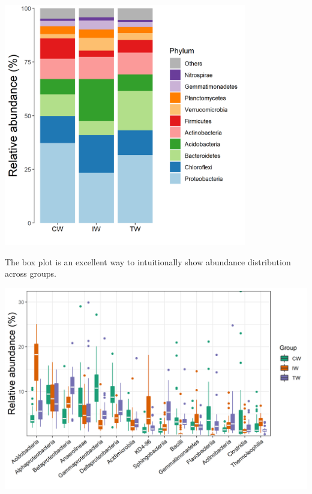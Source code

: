 \documentclass[
]{book}
\newenvironment{Shaded}{\begin{snugshade}}{\end{snugshade}}
\newcommand{\AttributeTok}[1]{\textcolor[rgb]{0.77,0.63,0.00}{#1}}
\newcommand{\CommentTok}[1]{\textcolor[rgb]{0.56,0.35,0.01}{\textit{#1}}}
\newcommand{\DecValTok}[1]{\textcolor[rgb]{0.00,0.00,0.81}{#1}}
\newcommand{\FunctionTok}[1]{\textcolor[rgb]{0.00,0.00,0.00}{#1}}
\newcommand{\NormalTok}[1]{#1}
\newcommand{\OtherTok}[1]{\textcolor[rgb]{0.56,0.35,0.01}{#1}}
\newcommand{\SpecialCharTok}[1]{\textcolor[rgb]{0.00,0.00,0.00}{#1}}
\newcommand{\StringTok}[1]{\textcolor[rgb]{0.31,0.60,0.02}{#1}}
\begin{document}
\begin{center}\includegraphics[width=400px]{Images/plot_bar_mean} \end{center}

The box plot is an excellent way to intuitionally show abundance distribution across groups.

\begin{Shaded}
\end{Shaded}

\begin{center}\includegraphics[width=700px]{Images/plot_box} \end{center}
\end{document}
